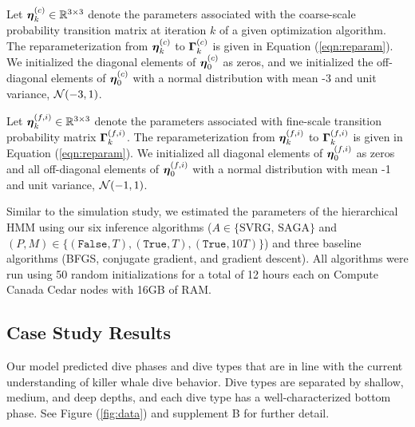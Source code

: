 Let $\boldsymbol{\eta}_k^{(c)} \in \mathbb{R}^{3 \times 3}$ denote the parameters associated with the coarse-scale probability transition matrix at iteration $k$ of a given optimization algorithm. The reparameterization from $\boldsymbol{\eta}_k^{(c)}$ to $\boldsymbol{\Gamma}_k^{(c)}$ is given in Equation (\ref{eqn:reparam}). We initialized the diagonal elements of $\boldsymbol{\eta}_0^{(c)}$ as zeros, and we initialized the off-diagonal elements of $\boldsymbol{\eta}_0^{(c)}$ with a normal distribution with mean -3 and unit variance, $\mathcal{N}(-3,1)$.

Let $\boldsymbol{\eta}_k^{(f,i)} \in \mathbb{R}^{3 \times 3}$ denote the parameters associated with fine-scale transition probability matrix $\boldsymbol{\Gamma}_k^{(f,i)}$. The reparameterization from $\boldsymbol{\eta}_k^{(f,i)}$ to $\boldsymbol{\Gamma}_k^{(f,i)}$ is given in Equation (\ref{eqn:reparam}). We initialized all diagonal elements of $\boldsymbol{\eta}_0^{(f,i)}$ as zeros and all off-diagonal elements of $\boldsymbol{\eta}_0^{(f,i)}$ with a normal distribution with mean -1 and unit variance, $\mathcal{N}(-1,1)$.

%
%
Similar to the simulation study, we estimated the parameters of the hierarchical HMM using our six inference algorithms ($A \in \{\text{SVRG, SAGA}\}$ and $(P,M) \in \{(\texttt{False},T),(\texttt{True},T),(\texttt{True},10T)\}$) and three baseline algorithms (BFGS, conjugate gradient, and gradient descent).
%
All algorithms were run using 50 random initializations for a total of 12 hours each on Compute Canada Cedar nodes with 16GB of RAM.

\subsection{Case Study Results}

Our model predicted dive phases and dive types that are in line with the current understanding of killer whale dive behavior. Dive types are separated by shallow, medium, and deep depths, and each dive type has a well-characterized bottom phase. See Figure (\ref{fig:data}) and supplement B for further detail.

